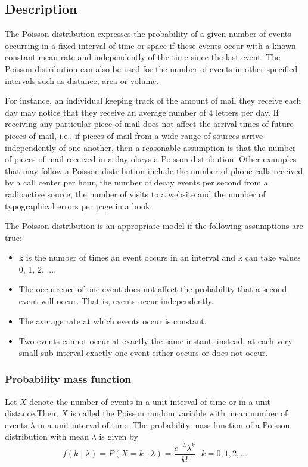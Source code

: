 \subsection{Description}
The Poisson distribution expresses the probability of a given number of events occurring in a fixed interval of time or space if these events occur with a known constant mean rate and independently of the time since the last event. The Poisson distribution can also be used for the number of events in other specified intervals such as distance, area or volume.

For instance, an individual keeping track of the amount of mail they receive each day may notice that they receive an average number of 4 letters per day. If receiving any particular piece of mail does not affect the arrival times of future pieces of mail, i.e., if pieces of mail from a wide range of sources arrive independently of one another, then a reasonable assumption is that the number of pieces of mail received in a day obeys a Poisson distribution. Other examples that may follow a Poisson distribution include the number of phone calls received by a call center per hour, the number of decay events per second from a radioactive source, the number of visits to a website and the number of typographical errors per page in a book.

The Poisson distribution is an appropriate model if the following assumptions are true:

\begin{itemize}
	\item k is the number of times an event occurs in an interval and k can take values 0, 1, 2, ....
	\item The occurrence of one event does not affect the probability that a second event will occur. That is, events occur independently.
	\item The average rate at which events occur is constant.
	\item Two events cannot occur at exactly the same instant; instead, at each very small sub-interval exactly one event either occurs or does not occur.
\end{itemize}


\subsubsection{Probability mass function}
Let $X$ denote the number of events in a unit interval of time or in a unit distance.Then, $X$ is called the Poisson random variable with mean number of events $\lambda$ in a unit interval of time. The probability mass function of a Poisson distribution with mean $\lambda$ is given by
\[
 	f(k \mid \lambda) = P(X = k \mid \lambda) = \frac{e^{-\lambda} \lambda^k}{k!}, \ k = 0, 1, 2, \ldots
\]

